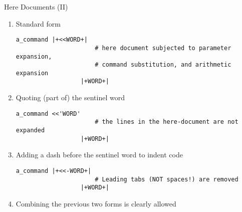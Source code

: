 \begin{frame}[fragile]{Here Documents (II)}
    \vspace{-3mm}
    \begin{enumerate}
        \item Standard form
              \begin{lstlisting}[style=MyBash, numbers=none, aboveskip=2mm, belowskip=-5mm]
                  a_command |+<<WORD+|
                      # here document subjected to parameter expansion,
                      # command substitution, and arithmetic expansion
                  |+WORD+|
              \end{lstlisting}
        \item Quoting (part of) the sentinel word
              \begin{lstlisting}[style=MyBash, numbers=none, aboveskip=2mm, belowskip=-5mm]
                  a_command <<'WORD'
                      # the lines in the here-document are not expanded
                  |+WORD+|
              \end{lstlisting}
        \item Adding a dash before the sentinel word to indent code
              \begin{lstlisting}[style=MyBash, numbers=none, aboveskip=2mm, belowskip=-5mm]
                  a_command |+<<-WORD+|
                      # Leading tabs (NOT spaces!) are removed
                  |+WORD+|
              \end{lstlisting}
        \item Combining the previous two forms is clearly allowed
    \end{enumerate}
\end{frame}
